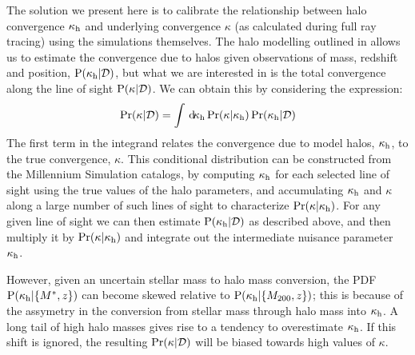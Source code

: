 \documentclass[useAMS,usenatbib]{mn2e}
\begin{document}
The solution we present here is to calibrate the relationship between halo
convergence $\kappa_{\rm h}$ and underlying convergence $\kappa$ (as calculated
during full ray tracing) using the simulations themselves.
The halo modelling \proceedure outlined in  allows 
us to estimate 
the convergence due to halos given observations of 
mass, redshift and position,
${\rm P}(\kappa_{\rm h}|\mathcal{D})$, but what we are interested in is the total convergence
along the line of sight ${\rm P}(\kappa|\mathcal{D})$. We can obtain this by
considering the expression:
\begin{equation}
\Pr(\kappa|\mathcal{D}) = \int \, \mathrm{d} \!\kappa_{\rm h} 
   \Pr(\kappa|\kappa_{\rm h}) \Pr(\kappa_{\rm h}|\mathcal{D})
\label{eq:kappaconv}   
\end{equation}
The first term in the integrand relates the convergence due to model halos,
$\kappa_{\rm h}$, to the true convergence, $\kappa$. This conditional distribution
can be constructed from the Millennium Simulation catalogs, by computing
$\kappa_{\rm h}$ for each selected line of sight using the true values of the halo
parameters,  and accumulating $\kappa_{\rm h}$ and $\kappa$ along a large number of
such lines of
sight to  characterize $\Pr(\kappa|\kappa_{\rm h})$.
For any given line of sight we can then estimate
${\rm P}(\kappa_{\rm h}|{\mathcal{D}})$ as described above, and then
multiply it by $\Pr(\kappa|\kappa_{\rm h})$ and integrate out the intermediate
nuisance parameter $\kappa_{\rm h}$. 

However, given an uncertain stellar mass to halo mass conversion, the PDF
${\rm P}(\kappa_{\rm h}|\{M^{*},z\})$ can become skewed relative to
${\rm P}(\kappa_{\rm h}|\{M_{200},z\})$; this is because of the assymetry in the
conversion from stellar mass through halo mass into $\kappa_{\rm h}$. A long tail of
high halo masses gives rise to a tendency to overestimate $\kappa_{\rm h}$.
If this shift is ignored, the resulting $\Pr(\kappa|{\mathcal{D}})$ will be 
biased towards high values of $\kappa$. 
\end{document}
